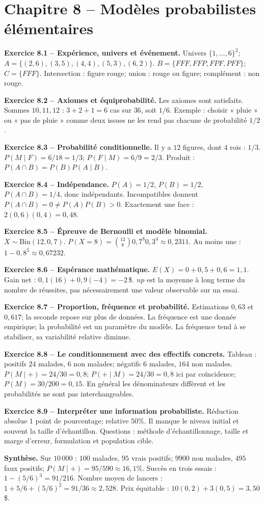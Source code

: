 \documentclass[11pt,a4paper,openany]{book}
\begin{document}
\chapter*{Chapitre 8 -- Modèles probabilistes élémentaires}
\begin{answerbox}
\textbf{Exercice 8.1 -- Expérience, univers et événement.} Univers $\{1,\ldots,6\}^2$; $A=\{(2,6),(3,5),(4,4),(5,3),(6,2)\}$. $B=\{FFF,FFP,FPF,PFF\}$; $C=\{FFF\}$. Intersection : figure rouge; union : rouge ou figure; complément : non rouge.\par
\textbf{Exercice 8.2 -- Axiomes et équiprobabilité.} Les axiomes sont satisfaits. Sommes $10,11,12$ : $3+2+1=6$ cas sur $36$, soit $1/6$. Exemple : choisir « pluie » ou « pas de pluie » comme deux issues ne les rend pas chacune de probabilité $1/2$.\par
\textbf{Exercice 8.3 -- Probabilité conditionnelle.} Il y a $12$ figures, dont $4$ rois : $1/3$. $P(M\mid F)=6/18=1/3$; $P(F\mid M)=6/9=2/3$. Produit : $P(A\cap B)=P(B)P(A\mid B)$.\par
\textbf{Exercice 8.4 -- Indépendance.} $P(A)=1/2$, $P(B)=1/2$, $P(A\cap B)=1/4$, donc indépendants. Incompatibles donnent $P(A\cap B)=0\neq P(A)P(B)>0$. Exactement une face : $2(0{,}6)(0{,}4)=0{,}48$.\par
\textbf{Exercice 8.5 -- Épreuve de Bernoulli et modèle binomial.} $X\sim\mathrm{Bin}(12,0{,}7)$. $P(X=8)=\binom{12}{8}0{,}7^8 0{,}3^4\approx0{,}2311$. Au moins une : $1-0{,}8^5\approx0{,}67232$.\par
\textbf{Exercice 8.6 -- Espérance mathématique.} $E(X)=0+0{,}5+0{,}6=1{,}1$. Gain net : $0{,}1(16)+0{,}9(-4)=-2\,$\$. $np$ est la moyenne à long terme du nombre de réussites, pas nécessairement une valeur observable sur un essai.\par
\textbf{Exercice 8.7 -- Proportion, fréquence et probabilité.} Estimations $0{,}63$ et $0{,}617$; la seconde repose sur plus de données. La fréquence est une donnée empirique; la probabilité est un paramètre du modèle. La fréquence tend à se stabiliser, sa variabilité relative diminue.\par
\textbf{Exercice 8.8 -- Le conditionnement avec des effectifs concrets.} Tableau : positifs $24$ malades, $6$ non malades; négatifs $6$ malades, $164$ non malades. $P(M\mid+)=24/30=0{,}8$; $P(+\mid M)=24/30=0{,}8$ ici par coïncidence; $P(M)=30/200=0{,}15$. En général les dénominateurs diffèrent et les probabilités ne sont pas interchangeables.\par
\textbf{Exercice 8.9 -- Interpréter une information probabiliste.} Réduction absolue $1$ point de pourcentage; relative $50\%$. Il manque le niveau initial et souvent la taille d'échantillon. Questions : méthode d'échantillonnage, taille et marge d'erreur, formulation et population cible.\par
\medskip\textbf{Synthèse.} Sur $10\,000$ : $100$ malades, $95$ vrais positifs; $9900$ non malades, $495$ faux positifs; $P(M\mid+)=95/590\approx16{,}1\%$. Succès en trois essais : $1-(5/6)^3=91/216$. Nombre moyen de lancers : $1+5/6+(5/6)^2=91/36\approx2{,}528$. Prix équitable : $10(0{,}2)+3(0{,}5)=3{,}50\,$\$.
\end{answerbox}
\end{document}
